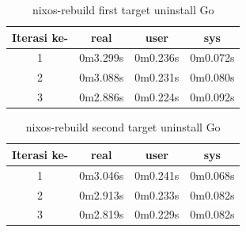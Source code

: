 \documentclass[10pt,twoside]{report}
\begin{document}
\begin{adjustwidth}{20pt}{}
	\begin{table}[H]
		\caption{nixos-rebuild first target uninstall Go}
		\begin{center}
			\begin{tabular}[c]{|c|c|c|c|}
				\hline
				\multicolumn{1}{|c|}{\textbf{Iterasi ke-}} &
				\multicolumn{1}{c|}{\textbf{real}}         &
				\multicolumn{1}{c|}{\textbf{user}}         &
				\multicolumn{1}{c|}{\textbf{sys}}                                           \\
				\hline
				1                                          & 0m3.299s & 0m0.236s & 0m0.072s \\
				\hline
				2                                          & 0m3.088s & 0m0.231s & 0m0.080s \\
				\hline
				3                                          & 0m2.886s & 0m0.224s & 0m0.092s \\
				\hline
			\end{tabular}
		\end{center}
	\end{table}
	\vspace{-5mm}
	\begin{table}[H]
		\caption{nixos-rebuild second target uninstall Go}
		\begin{center}
			\begin{tabular}[c]{|c|c|c|c|}
				\hline
				\multicolumn{1}{|c|}{\textbf{Iterasi ke-}} &
				\multicolumn{1}{c|}{\textbf{real}}         &
				\multicolumn{1}{c|}{\textbf{user}}         &
				\multicolumn{1}{c|}{\textbf{sys}}                                           \\
				\hline
				1                                          & 0m3.046s & 0m0.241s & 0m0.068s \\
				\hline
				2                                          & 0m2.913s & 0m0.233s & 0m0.082s \\
				\hline
				3                                          & 0m2.819s & 0m0.229s & 0m0.082s \\
				\hline
			\end{tabular}
		\end{center}
	\end{table}

\end{adjustwidth}
\end{document}
